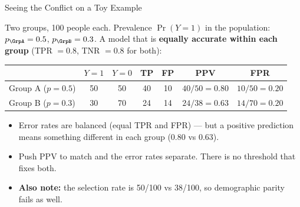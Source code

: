 \begin{frame}{Seeing the Conflict on a Toy Example}

    Two groups, 100 people each. Prevalence $\Pr(Y=1)$ in the population: $p_\GrpA = 0.5$,
    $p_\GrpB = 0.3$. A model that is \textbf{equally accurate within each group}
    (TPR $=0.8$, TNR $=0.8$ for both):

    \vspace{0.6em}
    \centering
    \small
    \begin{tabular}{lcccccc}
        \toprule
        & $Y=1$ & $Y=0$ & TP & FP & \textbf{PPV} & \textbf{FPR} \\
        \midrule
        Group A ($p=0.5$) & 50 & 50 & 40 & 10 & $40/50 = \mathbf{0.80}$ & $10/50 = \mathbf{0.20}$ \\
        Group B ($p=0.3$) & 30 & 70 & 24 & 14 & $24/38 = \mathbf{0.63}$ & $14/70 = \mathbf{0.20}$ \\
        \bottomrule
    \end{tabular}

    \vspace{1em}
    \raggedright

    \begin{itemize}\small
        \setlength\itemsep{0.35em}
        \item Error rates are balanced (equal TPR and FPR) --- but a positive prediction means
              something different in each group (0.80 vs 0.63).
        \item Push PPV to match and the error rates separate. There is no threshold that fixes both.
        \item \textbf{Also note:} the selection rate is 50/100 vs 38/100, so demographic parity
              fails as well.
    \end{itemize}
\end{frame}

